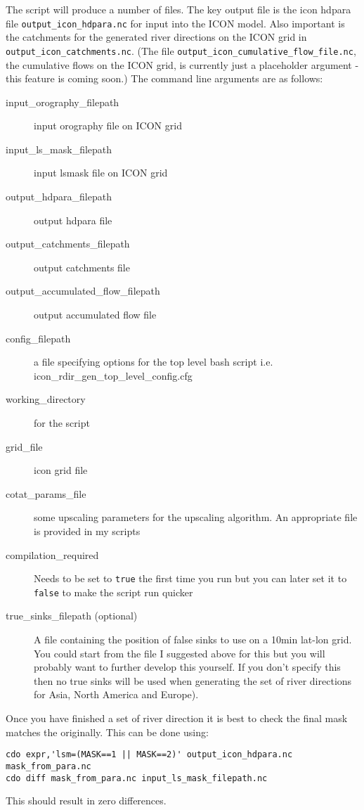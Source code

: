 \documentclass{article}
\begin{document}
The script will produce a number of files. The key output file is the icon hdpara file  \lstinline[style=bash_input]{output_icon_hdpara.nc} for input into the ICON model. Also important is the catchments for the generated river directions on the ICON grid in  \lstinline[style=bash_input]{output_icon_catchments.nc}. (The file \lstinline[style=bash_input]{output_icon_cumulative_flow_file.nc}, the cumulative flows on the ICON grid, is currently just a placeholder argument - this feature is coming soon.) The command line arguments are as follows:
\begin{description}
\item[input\_orography\_filepath] input orography file on ICON grid
\item[input\_ls\_mask\_filepath] input lsmask file on ICON grid
\item[output\_hdpara\_filepath] output hdpara file 
\item[output\_catchments\_filepath] output catchments file
\item[output\_accumulated\_flow\_filepath] output accumulated flow file
\item[config\_filepath] a file specifying options for the top level bash script i.e. icon\_rdir\_gen\_top\_level\_config.cfg
\item[working\_directory] for the script
\item[grid\_file] icon grid file
\item[cotat\_params\_file] some upscaling parameters for the upscaling algorithm. An appropriate file is provided in my scripts
\item[compilation\_required]  Needs to be set to \lstinline[style=bash_input]{true} the first time you run but you can later set it to \lstinline[style=bash_input]{false} to make the script run quicker
\item[true\_sinks\_filepath (optional)] A file containing the position of false sinks to use on a 10min lat-lon grid. You could start from the file I suggested above for this but you will probably want to further develop this yourself. If you don't specify this then no true sinks will be used when generating the set of river directions for Asia, North America and Europe).
\end{description}

Once you have finished a set of river direction it is best to check the final mask matches the originally. This can be done using:
\begin{lstlisting}[style=bash_input,breaklines=true]
cdo expr,'lsm=(MASK==1 || MASK==2)' output_icon_hdpara.nc mask_from_para.nc
cdo diff mask_from_para.nc input_ls_mask_filepath.nc
\end{lstlisting} 
This should result in zero differences.
\end{document}

